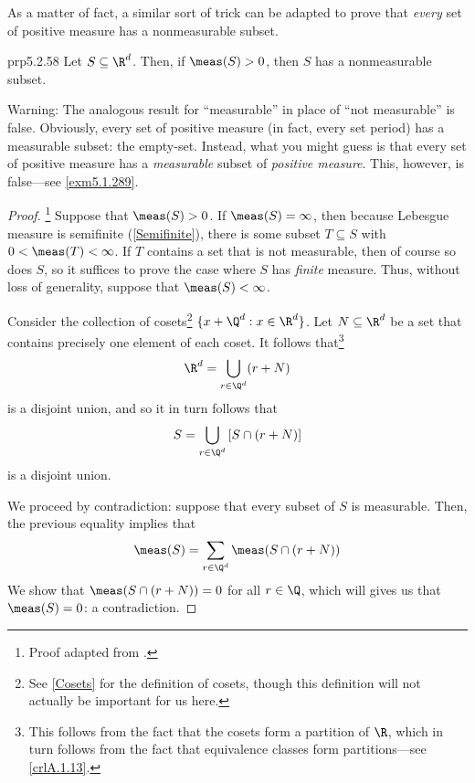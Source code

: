 As a matter of fact, a similar sort of trick can be adapted to prove that \emph{every} set of positive measure has a nonmeasurable subset.
\begin{prp}{}{prp5.2.58}
Let $S\subseteq \R ^d$.  Then, if $\meas (S)>0$, then $S$ has a nonmeasurable subset.
\begin{wrn}
Warning:  The analogous result for ``measurable'' in place of ``not measurable'' is false.  Obviously, every set of positive measure (in fact, every set period) has a measurable subset:  the empty-set.  Instead, what you might guess is that every set of positive measure has a \emph{measurable} subset of \emph{positive measure}.  This, however, is false---see \cref{exm5.1.289}.
\end{wrn}
\begin{proof}\footnote{Proof adapted from \cite[pg.~53]{BigRudin}.}
Suppose that $\meas (S)>0$.  If $\meas (S)=\infty$, then because Lebesgue measure is semifinite (\cref{Semifinite}), there is some subset $T\subseteq S$ with $0<\meas (T)<\infty$.  If $T$ contains a set that is not measurable, then of course so does $S$, so it suffices to prove the case where $S$ has \emph{finite} measure.  Thus, without loss of generality, suppose that $\meas (S)<\infty$.

Consider the collection of cosets\footnote{See \cref{Cosets} for the definition of cosets, though this definition will not actually be important for us here.} $\{ x+\Q ^d:x\in \R ^d\}$.  Let $N\subseteq \R ^d$ be a set that contains precisely one element of each coset.  It follows that\footnote{This follows from the fact that the cosets form a partition of $\R$, which in turn follows from the fact that equivalence classes form partitions---see \cref{crlA.1.13}.}
\begin{equation}\label{eqn5.2.112}
\R ^d=\bigcup _{r\in \Q ^d}(r+N)
\end{equation}
is a disjoint union, and so it in turn follows that
\begin{equation}
S=\bigcup _{r\in \Q ^d}\left[ S\cap (r+N)\right]
\end{equation}
is a disjoint union.

We proceed by contradiction:  suppose that every subset of $S$ is measurable.  Then, the previous equality implies that
\begin{equation}
\meas (S)=\sum _{r\in \Q ^d}\meas (S\cap (r+N))
\end{equation}
We show that $\meas (S\cap (r+N))=0$ for all $r\in \Q$, which will gives us that $\meas (S)=0$:  a contradiction.


\end{proof}
\end{prp}
